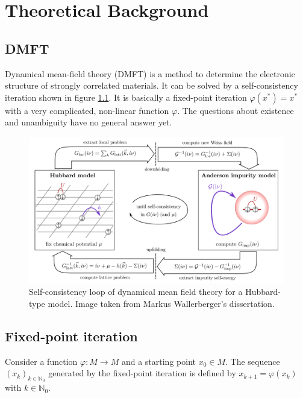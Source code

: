 \chapter{Theoretical Background}
\label{ch:background}

\section{DMFT}

Dynamical mean-field theory (DMFT) is a method to determine the electronic structure of strongly correlated materials. It can be solved by a self-consistency iteration shown in figure \ref{fig:dmft}.
It is basically a fixed-point iteration \(\varphi(x^\ast) = x^\ast\) with a very complicated, non-linear function \(\varphi\). The questions about existence and unambiguity have no general answer yet.

\begin{figure}[H]
    \centering
    \includegraphics[width=1.0\textwidth]{figures/dmft.png}
    \caption{Self-consistency loop of dynamical mean field theory for a Hubbard-type model. Image taken from Markus Wallerberger's dissertation.}
    \label{fig:dmft}
\end{figure}

\section{Fixed-point iteration}

Consider a function \(\varphi\colon M \to M\) and a starting point \(x_0 \in M\). The sequence \((x_k)_{k \in \mathbb{N}_0}\) generated by the fixed-point iteration is defined by \(x_{k+1} = \varphi(x_k)\) with \(k \in \mathbb{N}_0\).

